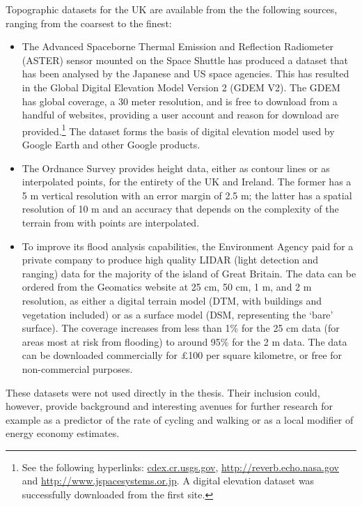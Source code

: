 Topographic datasets for the UK are available from the the following sources,
ranging from the coarsest to the finest:
\begin{itemize}
\item The Advanced Spaceborne Thermal Emission and Reflection Radiometer
(ASTER) sensor mounted on the Space Shuttle has produced a dataset that has been
analysed by the Japanese and US space agencies. This has resulted in the Global
Digital Elevation Model Version 2 (GDEM V2). The GDEM has global coverage, a 30
meter resolution, and is free to download from a handful of 
websites, providing a user account and reason for download are
provided.\footnote{See the
following hyperlinks: \href{http://gdex.cr.usgs.gov/gdex/}{cdex.cr.usgs.gov},
\href{http://reverb.echo.nasa.gov/reverb/}{http://reverb.echo.nasa.gov} and
\href{http://www.jspacesystems.or.jp/ersdac/GDEM/E/index.html}
{http://www.jspacesystems.or.jp}. A digital elevation dataset was successfully
downloaded from the first site.} The dataset forms the basis of digital
elevation model used by Google Earth and other Google products.
\item The Ordnance Survey provides height data, either as contour lines or as
interpolated points, for the entirety of the UK and Ireland. The former has a 5
m vertical resolution with an error margin of 2.5 m; the latter has a spatial
resolution of 10 m and an accuracy that depends on the complexity of the
terrain from with points are interpolated.
 \item To improve its flood analysis capabilities, the Environment Agency paid
for a private company to produce high quality LIDAR (light detection and
ranging) data for the majority of the island of Great Britain. The data can be
ordered from the Geomatics website at 25 cm, 50 cm, 1 m, and 2 m resolution, as
either a digital terrain model (DTM, with buildings and vegetation included) or
as a surface model (DSM, representing the `bare' surface). The coverage
increases from less than 1\% for the 25 cm data (for areas most at risk from
flooding) to around 95\% for the 2 m data. The data can be downloaded
commercially for \pounds100 per square kilometre, or free for non-commercial purposes.
\end{itemize}
These datasets were not used directly in the thesis.
Their inclusion could, however, provide background and interesting avenues
for further research for example as a predictor of
the rate of cycling and walking or as a local modifier of energy economy estimates.

